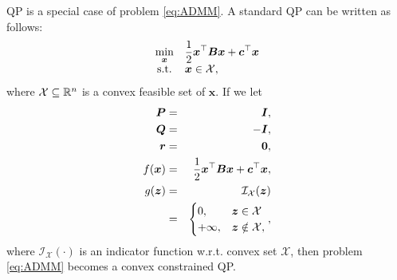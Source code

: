 QP is a special case of problem \eqref{eq:ADMM}.
A standard QP can be written as follows:
\begin{equation}
    \begin{array}{cl}
        \underset{\bm x}{\min} &
        \displaystyle \frac{1}{2} \bm x^\top \bm B \bm x + \bm c^\top \bm x \\
        \text{s.t.} & \bm x \in \mathcal X,
    \end{array}
\end{equation}
where $\mathcal X \subseteq \mathbb R^n$ is a convex feasible set of $\bm x$.
If we let
\begin{eqnarray}
    \bm P    & = & \bm I, \nonumber \\
    \bm Q    & = & -\bm I, \nonumber \\
    \bm r    & = & \bm 0, \nonumber \\
    f(\bm x) & = & \frac{1}{2} \bm x^\top \bm B \bm x + \bm c^\top \bm x, \nonumber \\
    g(\bm z) & = & \mathcal I_{\mathcal X}(\bm z) \nonumber \\
             & = & \begin{cases}
                       0,       & \bm z \in    \mathcal X \\
                       +\infty, & \bm z \notin \mathcal X,
                   \end{cases}, \nonumber
\end{eqnarray}
where $\mathcal I_{\mathcal X}(\cdot)$ is an indicator function w.r.t. convex set
$\mathcal X$, then problem \eqref{eq:ADMM} becomes a convex constrained QP.

